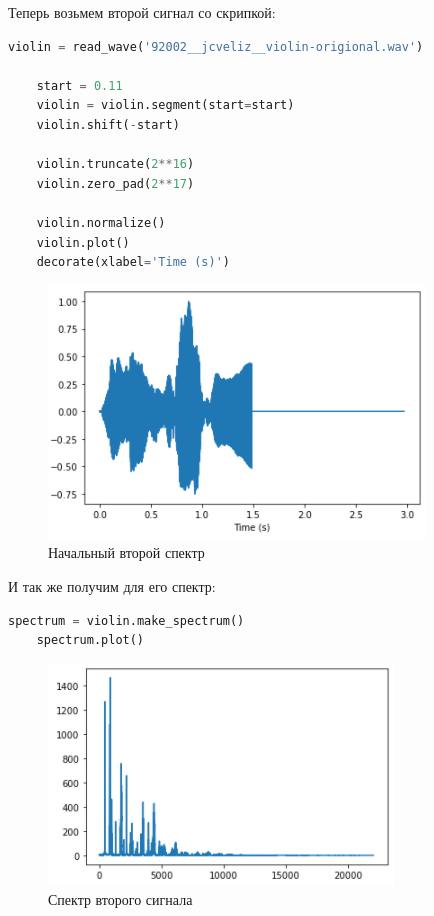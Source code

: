 \documentclass[a4paper]{article}
\begin{document}
            Теперь возьмем второй сигнал со скрипкой:
            
\begin{lstlisting}[language=Python, caption= Получение второго сигнала]
    violin = read_wave('92002__jcveliz__violin-origional.wav')

    start = 0.11
    violin = violin.segment(start=start)
    violin.shift(-start)
    
    violin.truncate(2**16)
    violin.zero_pad(2**17)
    
    violin.normalize()
    violin.plot()
    decorate(xlabel='Time (s)')
\end{lstlisting}
            
            \begin{figure}[H]
                \centering
                \includegraphics{ex_1_3.png}
                \caption{Начальный второй спектр}
                \label{fig:ex_1_3}
            \end{figure}
            
            И так же получим для его спектр:
            
\begin{lstlisting}[language=Python, caption= Получение спектра второго сигнала]
    spectrum = violin.make_spectrum()
    spectrum.plot()
\end{lstlisting}
            
            \begin{figure}[H]
                \centering
                \includegraphics{ex_1_4.png}
                \caption{Спектр второго сигнала}
                \label{fig:ex_1_4}
            \end{figure}
            
\end{document}
